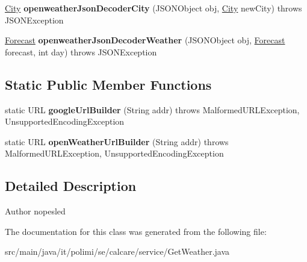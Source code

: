 \begin{DoxyCompactItemize}
\item 
\hypertarget{classit_1_1polimi_1_1se_1_1calcare_1_1service_1_1GetWeather_a1f45a4455bba9b3c50ac99279048c9bd}{}\hyperlink{classit_1_1polimi_1_1se_1_1calcare_1_1entities_1_1City}{City} {\bfseries openweather\+Json\+Decoder\+City} (J\+S\+O\+N\+Object obj, \hyperlink{classit_1_1polimi_1_1se_1_1calcare_1_1entities_1_1City}{City} new\+City)  throws J\+S\+O\+N\+Exception \label{classit_1_1polimi_1_1se_1_1calcare_1_1service_1_1GetWeather_a1f45a4455bba9b3c50ac99279048c9bd}

\item 
\hypertarget{classit_1_1polimi_1_1se_1_1calcare_1_1service_1_1GetWeather_a4a989fb5ee4c108ce4bf235637ea5169}{}\hyperlink{classit_1_1polimi_1_1se_1_1calcare_1_1entities_1_1Forecast}{Forecast} {\bfseries openweather\+Json\+Decoder\+Weather} (J\+S\+O\+N\+Object obj, \hyperlink{classit_1_1polimi_1_1se_1_1calcare_1_1entities_1_1Forecast}{Forecast} forecast, int day)  throws J\+S\+O\+N\+Exception \label{classit_1_1polimi_1_1se_1_1calcare_1_1service_1_1GetWeather_a4a989fb5ee4c108ce4bf235637ea5169}

\end{DoxyCompactItemize}
\subsection*{Static Public Member Functions}
\begin{DoxyCompactItemize}
\item 
\hypertarget{classit_1_1polimi_1_1se_1_1calcare_1_1service_1_1GetWeather_a89c2d71276ec050762a620f0a58c9c7d}{}static U\+R\+L {\bfseries google\+Url\+Builder} (String addr)  throws Malformed\+U\+R\+L\+Exception, Unsupported\+Encoding\+Exception \label{classit_1_1polimi_1_1se_1_1calcare_1_1service_1_1GetWeather_a89c2d71276ec050762a620f0a58c9c7d}

\item 
\hypertarget{classit_1_1polimi_1_1se_1_1calcare_1_1service_1_1GetWeather_a1f28fbf7200efedbac9fa5636629a3b8}{}static U\+R\+L {\bfseries open\+Weather\+Url\+Builder} (String addr)  throws Malformed\+U\+R\+L\+Exception, Unsupported\+Encoding\+Exception \label{classit_1_1polimi_1_1se_1_1calcare_1_1service_1_1GetWeather_a1f28fbf7200efedbac9fa5636629a3b8}

\end{DoxyCompactItemize}


\subsection{Detailed Description}
\begin{DoxyAuthor}{Author}
nopesled 
\end{DoxyAuthor}


The documentation for this class was generated from the following file\+:\begin{DoxyCompactItemize}
\item 
src/main/java/it/polimi/se/calcare/service/Get\+Weather.\+java\end{DoxyCompactItemize}
